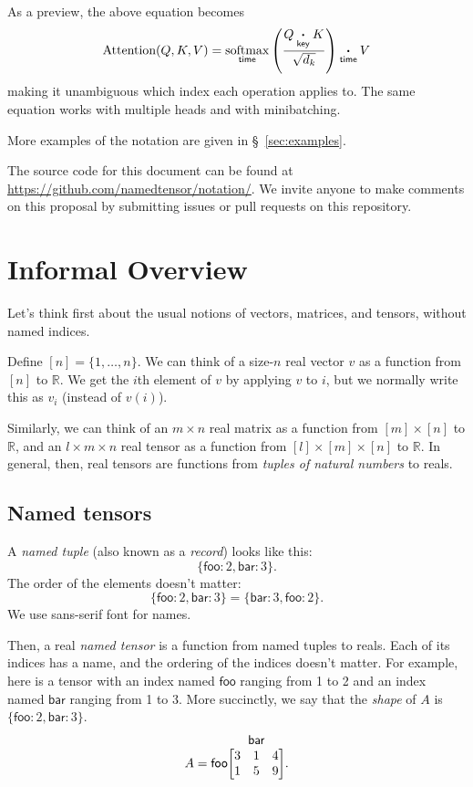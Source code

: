 \documentclass{article}
\makeatletter
\newcommand{\name}[1]{\mathsf{#1}}
\newcommand{\ndot}[1]{\mathbin{\mathop{\thinspace\boldsymbol\cdot\thinspace}\limits_{\name{#1}}}}
\newcommand{\nfun}[2]{\mathop{\text{#2}}\limits_{\name{#1}}}
\newcommand{\tuple}[1]{\{ #1\}}
\newcommand{\nmatrix}[3]{\name{#1}\begin{array}[b]{@{}c@{}}\name{#2}\\\begin{bmatrix}#3\end{bmatrix}\end{array}}
\makeatother
\begin{document}
As a preview, the above equation becomes
\begin{equation*}
  \text{Attention}(Q,K,V) = \nfun{time}{softmax} \left( \frac{Q \ndot{key} K}{\sqrt{d_k}} \right) \ndot{time} V
\end{equation*}
making it unambiguous which index each operation applies to. The same equation works with multiple heads and with minibatching.

More examples of the notation are given in \S~\ref{sec:examples}.

The source code for this document can be found at \url{https://github.com/namedtensor/notation/}. We invite anyone to make comments on this proposal by submitting issues or pull requests on this repository.

\section{Informal Overview}
\label{sec:intro}

Let's think first about the usual notions of vectors, matrices, and tensors, without named indices.

Define $[n] = \{1, \ldots, n\}$. We can think of a size-$n$ real vector $v$ as a function from $[n]$ to $\mathbb{R}$. We get the $i$th element of $v$ by applying $v$ to $i$, but we normally write this as $v_i$ (instead of $v(i)$). 

Similarly, we can think of an $m \times n$ real matrix as a function from $[m] \times [n]$ to $\mathbb{R}$, and an $l \times m \times n$ real tensor as a function from $[l] \times [m] \times [n]$ to $\mathbb{R}$. In general, then, real tensors are functions from \emph{tuples of natural numbers} to reals.

\subsection{Named tensors}

A \emph{named tuple} (also known as a \emph{record}) looks like this: \[\tuple{\name{foo}: 2, \name{bar}: 3}.\] The order of the elements doesn't matter: \[\tuple{\name{foo}: 2, \name{bar}: 3} = \tuple{\name{bar}: 3, \name{foo}: 2}.\] We use \textsf{sans-serif} font for names.

Then, a real \emph{named tensor} is a function from named tuples to reals. Each of its indices has a name, and the ordering of the indices doesn't matter. For example, here is a tensor with an index named $\name{foo}$ ranging from 1 to 2 and an index named $\name{bar}$ ranging from 1 to 3. More succinctly, we say that the \emph{shape} of $A$ is $\tuple{\name{foo}:2, \name{bar}:3}$.
\begin{equation*}
A = \nmatrix{foo}{bar}{
  3 & 1 & 4 \\
  1 & 5 & 9
}.
\end{equation*}
\end{document}

